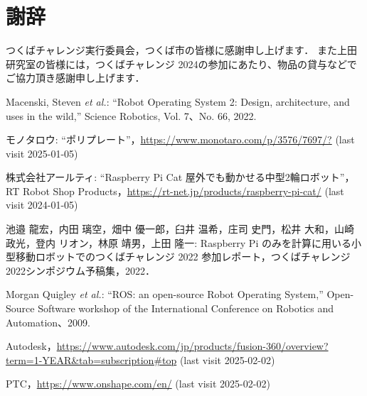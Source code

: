 \documentclass[twocolumn,9pt]{jsproceedings}
\begin{document}
\section*{謝辞}
つくばチャレンジ実行委員会，つくば市の皆様に感謝申し上げます．
また上田研究室の皆様には，つくばチャレンジ 2024の参加にあたり、物品の貸与などでご協力頂き感謝申し上げます．

\footnotesize
\begin{thebibliography}{99}

  Macenski, Steven {\it et al.}: ``Robot Operating System 2: Design, architecture, and uses in the wild,''
  Science Robotics, Vol. 7、No. 66, 2022.



  モノタロウ: ``ポリプレート''，\url{https://www.monotaro.com/p/3576/7697/?} (last visit 2025-01-05)

  株式会社アールティ: ``Raspberry Pi Cat 屋外でも動かせる中型2輪ロボット''，
  RT Robot Shop Products，\url{https://rt-net.jp/products/raspberry-pi-cat/} (last visit 2024-01-05)

  池邉 龍宏，内田 璃空，畑中 優一郎，臼井 温希，庄司 史門，松井 大和，山崎 政光，登内 リオン，林原 靖男，上田 隆一: Raspberry Pi のみを計算に用いる小型移動ロボットでのつくばチャレンジ 2022 参加レポート，つくばチャレンジ2022シンポジウム予稿集，2022．

  Morgan Quigley {\it et al.}: ``ROS: an open-source Robot Operating System,''
  Open-Source Software workshop of the International Conference on Robotics and Automation、2009.

  Autodesk，\url{https://www.autodesk.com/jp/products/fusion-360/overview?term=1-YEAR&tab=subscription#top} (last visit 2025-02-02)

  PTC，\url{https://www.onshape.com/en/} (last visit 2025-02-02)


\end{thebibliography}
\end{document}
